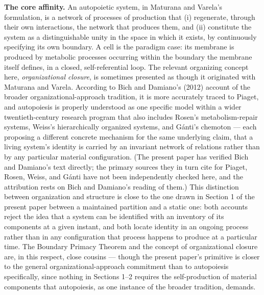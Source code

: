 \documentclass[11pt]{article}
\theoremstyle{plain}
\begin{document}
\textbf{The core affinity.} An autopoietic system, in Maturana and Varela's formulation, is a network of processes of production that (i) regenerate, through their own interactions, the network that produces them, and (ii) constitute the system as a distinguishable unity in the space in which it exists, by continuously specifying its own boundary. A cell is the paradigm case: its membrane is produced by metabolic processes occurring within the boundary the membrane itself defines, in a closed, self-referential loop. The relevant organizing concept here, \emph{organizational closure}, is sometimes presented as though it originated with Maturana and Varela. According to Bich and Damiano's (2012) account of the broader organizational-approach tradition, it is more accurately traced to Piaget, and autopoiesis is properly understood as one specific model within a wider twentieth-century research program that also includes Rosen's metabolism-repair systems, Weiss's hierarchically organized systems, and Gánti's chemoton --- each proposing a different concrete mechanism for the same underlying claim, that a living system's identity is carried by an invariant network of relations rather than by any particular material configuration. (The present paper has verified Bich and Damiano's text directly; the primary sources they in turn cite for Piaget, Rosen, Weiss, and Gánti have not been independently checked here, and the attribution rests on Bich and Damiano's reading of them.) This distinction between organization and structure is close to the one drawn in Section 1 of the present paper between a maintained partition and a static one: both accounts reject the idea that a system can be identified with an inventory of its components at a given instant, and both locate identity in an ongoing process rather than in any configuration that process happens to produce at a particular time. The Boundary Primacy Theorem and the concept of organizational closure are, in this respect, close cousins --- though the present paper's primitive is closer to the general organizational-approach commitment than to autopoiesis specifically, since nothing in Sections 1--2 requires the self-production of material components that autopoiesis, as one instance of the broader tradition, demands.
\end{document}
